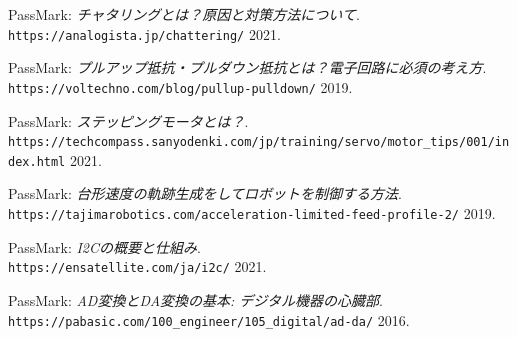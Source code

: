 \documentclass{ltjsarticle} %
\begin{document}
\begin{thebibliography}{99} %
    
    PassMark: 
    \emph{チャタリングとは？原因と対策方法について}. \\
    \verb|https://analogista.jp/chattering/|  2021.
  
    PassMark: 
    \emph{プルアップ抵抗・プルダウン抵抗とは？電子回路に必須の考え方}. \\
    \verb|https://voltechno.com/blog/pullup-pulldown/|  2019.
  
    PassMark: 
    \emph{ステッピングモータとは？}. \\
    \verb|https://techcompass.sanyodenki.com/jp/training/servo/motor_tips/001/index.html|  2021.

    PassMark: 
    \emph{台形速度の軌跡生成をしてロボットを制御する方法}. \\
    \verb|https://tajimarobotics.com/acceleration-limited-feed-profile-2/|  2019.

    PassMark: 
    \emph{I2Cの概要と仕組み}. \\
    \verb|https://ensatellite.com/ja/i2c/|  2021.

    PassMark: 
    \emph{AD変換とDA変換の基本: デジタル機器の心臓部}. \\
    \verb|https://pabasic.com/100_engineer/105_digital/ad-da/|  2016.
  
\end{thebibliography}
  
  
\end{document}
